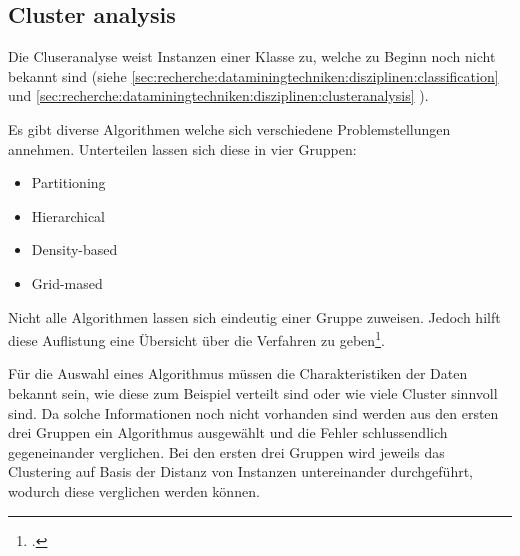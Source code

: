 %
%
%

\subsection{Cluster analysis}
Die Cluseranalyse weist Instanzen einer Klasse zu, welche zu Beginn noch nicht bekannt sind (siehe \cref{sec:recherche:dataminingtechniken:disziplinen:classification}  und \cref{sec:recherche:dataminingtechniken:disziplinen:clusteranalysis} ).

Es gibt diverse Algorithmen welche sich verschiedene Problemstellungen annehmen. Unterteilen lassen sich diese in vier Gruppen:
\begin{itemize}
	\item Partitioning
	\item Hierarchical
	\item Density-based
	\item Grid-mased
\end{itemize}
Nicht alle Algorithmen lassen sich eindeutig einer Gruppe zuweisen. Jedoch hilft diese Auflistung eine Übersicht über die Verfahren zu geben\footcite{data_mining_concepts_and_techniques}.

Für die Auswahl eines Algorithmus müssen die Charakteristiken der Daten bekannt sein, wie diese zum Beispiel verteilt sind oder wie viele Cluster sinnvoll sind. 
Da solche Informationen noch nicht vorhanden sind werden aus den ersten drei Gruppen ein Algorithmus ausgewählt und die Fehler schlussendlich gegeneinander verglichen.
Bei den ersten drei Gruppen wird jeweils das Clustering auf Basis der Distanz von Instanzen untereinander durchgeführt, wodurch diese verglichen werden können.
 
